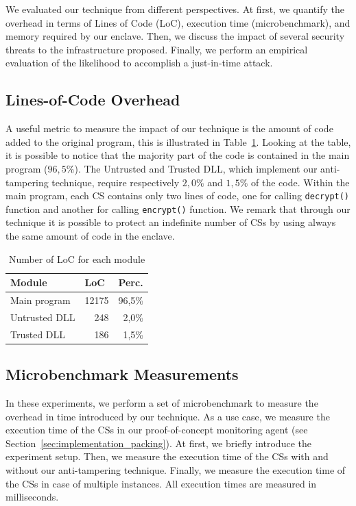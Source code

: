 We evaluated our technique from different perspectives.
At first, we quantify the overhead in terms of Lines of Code (LoC), execution 
time (microbenchmark), and memory required by our enclave.
Then, we discuss the impact of several security threats to the infrastructure 
proposed.
Finally, we perform an empirical evaluation of the likelihood to accomplish a 
just-in-time attack.

\subsection{Lines-of-Code Overhead}

A useful metric to measure the impact of our technique is the amount of code 
added to the original program, this is illustrated in Table~\ref{tbl:loc-stats}.
Looking at the table, it is possible to notice that the majority part of the 
code is contained in the main program ($96,5\%$).
The Untrusted and Trusted DLL, which implement our anti-tampering technique, 
require respectively $2,0\%$ and $1,5\%$ of the code.
Within the main program, each CS contains only two lines of code, one for 
calling \texttt{decrypt()} function and another for calling \texttt{encrypt()} 
function.
We remark that through our technique it is possible to protect an indefinite 
number of CSs by using always the same amount of code in the enclave.
~
\begin{table}[h]
	\center
	\caption{Number of LoC for each module}
	\label{tbl:loc-stats}
	\begin{tabular}{lrr}
		\toprule
		Module & \multicolumn{1}{l}{LoC} & \multicolumn{1}{l}{Perc.} \\
		\midrule
		Main program & 12175 & 96,5\% \\
		Untrusted DLL & 248 & 2,0\% \\
		Trusted DLL & 186 & 1,5\% \\
		\bottomrule
	\end{tabular}
\end{table}

\subsection{Microbenchmark Measurements}
In these experiments, we perform a set of microbenchmark to measure the 
overhead in time introduced by our technique.
As a use case, we measure the execution time of the CSs in our proof-of-concept 
monitoring agent (see Section~\ref{sec:implementation_packing}).
At first, we briefly introduce the experiment setup.
Then, we measure the execution time of the CSs with and without our 
anti-tampering technique.
Finally, we measure the execution time of the CSs in case of multiple instances.
All execution times are measured in milliseconds.

